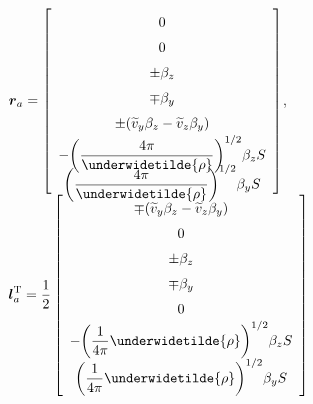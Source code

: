 \begin{center}
$\renewcommand{\arraystretch}{1.5}
\mbox{\boldmath $r$}_{a} =
\left[
\begin{array}{c}
0 \\
0 \\
\pm \beta_{z} \\
\mp \beta_{y} \\
\pm ( \widetilde{v}_{y} \beta_{z} - \widetilde{v}_{z} \beta_{y} ) \\
\displaystyle
- \biggl( \frac{4 \pi}{\underwidetilde{\rho}} \biggr)^{1/2}
\beta_{z} S \vspace{-6pt} \\ 
\displaystyle
\biggl( \frac{4 \pi}{\underwidetilde{\rho}} \biggr)^{1/2}
\beta_{y} S \vspace{-6pt} \\ 
\end{array} 
\right]$, $\;$
$\renewcommand{\arraystretch}{1.5}
\displaystyle
\mbox{\boldmath $l$}_{a}^{\rm T} =
\frac{1}{2}
\left[
\begin{array}{c}
\mp ( \widetilde{v}_{y} \beta_{z} - \widetilde{v}_{z} \beta_{y}) \\
0 \\
\pm \beta_{z} \\
\mp \beta_{y} \\
0 \\
\displaystyle
- \biggl( \frac1{4 \pi} {\underwidetilde{\rho}} \biggr)^{1/2}
\beta_{z} S \\
\displaystyle
\biggl( \frac1{4 \pi} {\underwidetilde{\rho}} \biggr)^{1/2}
\beta_{y} S \\
\end{array}
\right]$ 
\end{center}

\newpage

